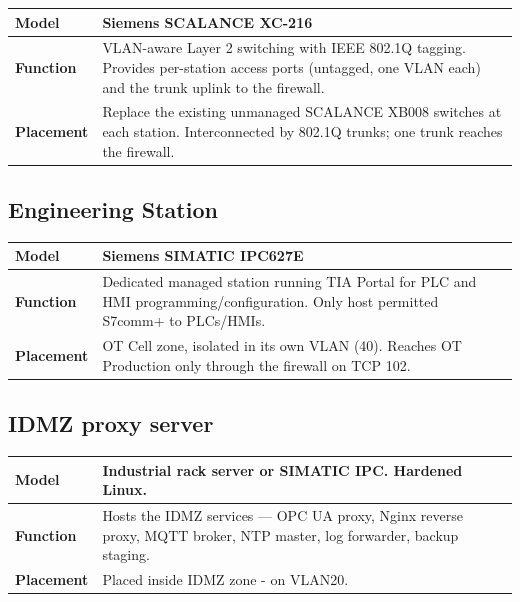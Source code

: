 \documentclass{report}
\begin{document}
\renewcommand{\arraystretch}{1.3} %
\begin{tabularx}{\textwidth}{>{\bfseries}p{2.5cm} X}
    \toprule
    Model & Siemens SCALANCE XC-216  \\
    \midrule
    Function & VLAN-aware Layer 2 switching with IEEE 802.1Q tagging. Provides
    per-station access ports (untagged, one VLAN each) and the trunk uplink to
    the firewall. \\
    \midrule
    Placement & Replace the existing unmanaged SCALANCE XB008 switches at each
    station. Interconnected by 802.1Q trunks; one trunk reaches the firewall.
    \\
    \midrule
\end{tabularx}

\subsection{Engineering Station}

\renewcommand{\arraystretch}{1.3} %
\begin{tabularx}{\textwidth}{>{\bfseries}p{2.5cm} X}
    \toprule
    Model & Siemens SIMATIC IPC627E\\
    \midrule
    Function & Dedicated managed station running TIA Portal for PLC and HMI
    programming/configuration. Only host permitted S7comm+ to PLCs/HMIs.\\
    \midrule
    Placement & OT Cell zone, isolated in its own VLAN (40). Reaches OT
    Production only through the firewall on TCP 102.\\
    \midrule
\end{tabularx}

\subsection{IDMZ proxy server}

\renewcommand{\arraystretch}{1.3} %
\begin{tabularx}{\textwidth}{>{\bfseries}p{2.5cm} X}
    \toprule
    Model & Industrial rack server or SIMATIC IPC. Hardened Linux.\\
    \midrule
    Function & Hosts the IDMZ services — OPC UA proxy, Nginx reverse proxy,
    MQTT broker, NTP master, log forwarder, backup staging. \\
    \midrule
    Placement & Placed inside IDMZ zone - on VLAN20. \\
    \midrule
\end{tabularx}
\end{document}
